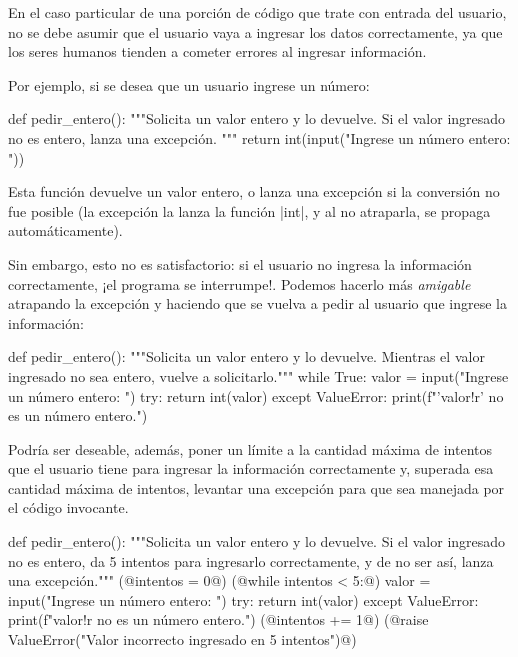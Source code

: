 En el caso particular de una porción de código que trate con entrada del
usuario, no se debe asumir que el usuario vaya a ingresar los datos
correctamente, ya que los seres humanos tienden a cometer errores al ingresar
información.

Por ejemplo, si se desea que un usuario ingrese un número:

\begin{codigo-python-sn}
def pedir_entero():
    """Solicita un valor entero y lo devuelve.
    Si el valor ingresado no es entero, lanza una excepción.
    """
    return int(input("Ingrese un número entero: "))
\end{codigo-python-sn}

Esta función devuelve un valor entero, o lanza una excepción si la conversión
no fue posible (la excepción la lanza la función |int|, y al no atraparla, se
propaga automáticamente).

Sin embargo, esto no es satisfactorio: si el usuario no ingresa la información
correctamente, ¡el programa se interrumpe!. Podemos hacerlo más \emph{amigable}
atrapando la excepción y haciendo que se vuelva a pedir al usuario que ingrese
la información:

\begin{codigo-python-sn}
def pedir_entero():
    """Solicita un valor entero y lo devuelve.
    Mientras el valor ingresado no sea entero, vuelve a solicitarlo."""
    while True:
        valor = input("Ingrese un número entero: ")
        try:
            return int(valor)
        except ValueError:
            print(f"'{valor!r}' no es un número entero.")
\end{codigo-python-sn}

Podría ser deseable, además, poner un límite a la cantidad máxima de intentos
que el usuario tiene para ingresar la información correctamente y, superada
esa cantidad máxima de intentos, levantar una excepción para que sea manejada
por el código invocante.

\begin{codigo-python-sn}
def pedir_entero():
    """Solicita un valor entero y lo devuelve.
    Si el valor ingresado no es entero, da 5 intentos para ingresarlo
    correctamente, y de no ser así, lanza una excepción."""
    (@intentos = 0@)
    (@while intentos < 5:@)
        valor = input("Ingrese un número entero: ")
        try:
            return int(valor)
        except ValueError:
            print(f"{valor!r} no es un número entero.")
            (@intentos += 1@)
    (@raise ValueError("Valor incorrecto ingresado en 5 intentos")@)
\end{codigo-python-sn}

